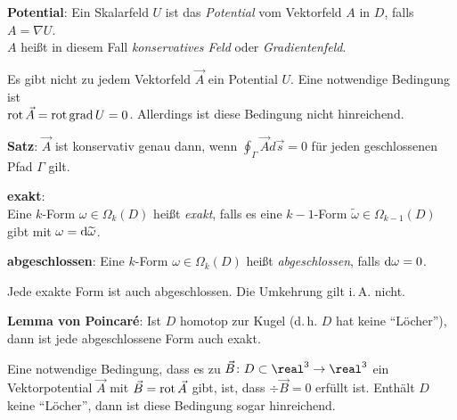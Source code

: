 \textbf{Potential}:
Ein Skalarfeld $U$ ist das \emph{Potential} vom Vektorfeld $A$ in $D$,
falls $A = \nabla U$. \\
$A$ heißt in diesem Fall \emph{konservatives Feld} oder \emph{Gradientenfeld}.

Es gibt nicht zu jedem Vektorfeld $\vec{A}$ ein Potential $U$.
Eine notwendige Bedingung ist \\
$\operatorname{rot} \vec{A} = \operatorname{rot} \operatorname{grad} U = 0$.
Allerdings ist diese Bedingung nicht hinreichend.

\textbf{Satz}:
$\vec{A}$ ist konservativ genau dann, wenn $\oint_\Gamma \vec{A} d\vec{s} = 0$
für jeden geschlossenen Pfad $\Gamma$ gilt.

\linie

\textbf{exakt}: \\
Eine $k$-Form $\omega \in \Omega_k(D)$ heißt \emph{exakt}, falls
es eine $k - 1$-Form $\widetilde{\omega} \in \Omega_{k-1}(D)$ gibt mit
$\omega = \mathrm{d}\widetilde{\omega}$.

\textbf{abgeschlossen}:
Eine $k$-Form $\omega \in \Omega_k(D)$ heißt \emph{abgeschlossen}, falls
$\mathrm{d}\omega = 0$.

Jede exakte Form ist auch abgeschlossen.
Die Umkehrung gilt i.\,A. nicht.

\textbf{Lemma von Poincaré}:
Ist $D$ homotop zur Kugel (d.\,h. $D$ hat keine "`Löcher"'),
dann ist jede abgeschlossene Form auch exakt.

\linie

Eine notwendige Bedingung, dass es zu
$\vec{B}\colon D \subset \real^3 \rightarrow \real^3$ ein Vektorpotential
$\vec{A}$ mit $\vec{B} = \operatorname{rot} \vec{A}$ gibt, ist, dass $\div \vec{B} = 0$
erfüllt ist.
Enthält $D$ keine "`Löcher"', dann ist diese Bedingung sogar hinreichend.

\pagebreak
